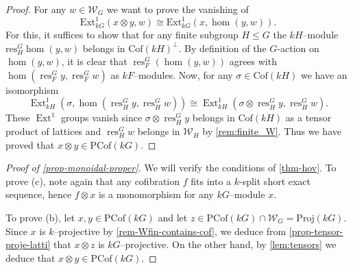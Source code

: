 \documentclass{amsart}
\newcommand{\GD}[1]{{\color{ForestGreen} G: [#1]}}
\newcommand{\res}{\operatorname{res}\nolimits}
\newcommand{\Ext}{\operatorname{Ext}\nolimits}
\def \W{{\mathcal W}}
\def \Wfin{{\mathcal W}_{G}}
\DeclareMathOperator{\Mod}{Mod}
\DeclareMathOperator{\Cof}{Cof}
\numberwithin{equation}{section}%
\theoremstyle{remark}
\begin{document}
{ \begin{proof}
For any $w\in\mathcal{W}_G$ we want to prove the vanishing of 
\[
\mathrm{Ext}^1_{kG}(x\otimes y,w)\cong \mathrm{Ext}^1_{kG}(x,\hom(y,w)).
\]
For this, it suffices to show that for any finite subgroup $H\leqslant  G$ the $kH$--module $\mathrm{res}^G_H\hom(y,w)$ belongs in $\mathrm{Cof}({kH})^{\perp}$. By definition of the $G$-action on $\hom(y,w)$, it is clear that $\res^G_F(\hom(y,w))$ agrees with $\hom(\res^G_Fy,\res^G_F w)$ as $kF$--modules. Now, for any $\sigma\in\mathrm{Cof}(kH)$ we have an isomorphism $$\Ext^1_{kH}(\sigma,\hom(\res^G_Hy,\res^G_Hw))\cong \Ext^1_{kH}(\sigma \otimes\res^G_Hy,\res^G_Hw).$$
These $\Ext^1$ groups vanish since $\sigma\otimes\res^G_Hy$ belongs in $\mathrm{Cof}(kH)$ as a tensor product of lattices and $\res^G_Hw$ belongs in $\W_H$ by \cref{rem:finite_W}. Thus we have proved that $x\otimes y\in\mathrm{PCof}(kG)$. 
%
%
\end{proof}



 





\begin{proof}[Proof of \cref{prop-monoidal-proper}] 
We will verify the conditions of \cref{thm-hov}. To prove (c), note again that any cofibration $f$ fits into a $k$-split short exact sequence, hence $f\otimes x$ is a monomorphism for any $kG$--module $x$. 

To prove (b), let $x,y\in \mathrm{PCof}(kG)$ and let $z\in \mathrm{PCof}(kG)\cap \Wfin=\mathrm{Proj}(kG)$. Since $x$ is $k$--projective by \cref{rem-Wfin-contains-cof}, we deduce from \cref{prop-tensor-proje-latti} that $x\otimes z$ is $kG$--projective. On the other hand, by \cref{lem:tensors} we deduce that $x\otimes y \in\mathrm{PCof}(kG)$.


\end{proof}}
\end{document}
